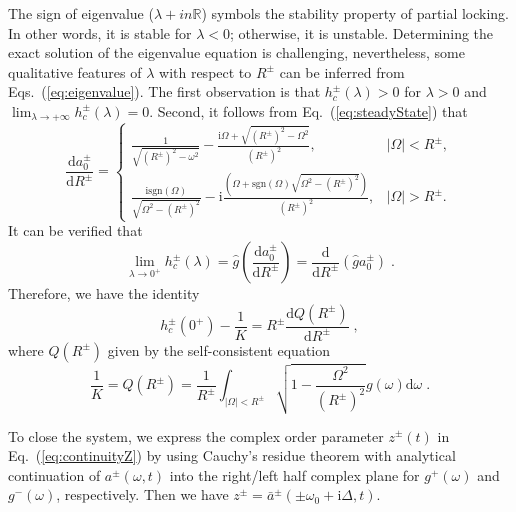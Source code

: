 \documentclass{article}
\begin{document}
The sign of eigenvalue ($\lambda+in \mathbb{R}$) symbols the stability property of partial locking. In other words, it is stable for $\lambda<0$; otherwise, it is unstable. Determining the exact solution of the eigenvalue equation is challenging, nevertheless, some qualitative features of $\lambda$ with respect to $R^{\pm}$ can be inferred from Eqs.~(\ref{eq:eigenvalue}). The first observation is that $h_c^{\pm}(\lambda) > 0$ for $\lambda > 0$ and $\lim_{\lambda \rightarrow +\infty} h_{c}^{\pm}\left( \lambda \right) =0$. Second, it follows from Eq.~(\ref{eq:steadyState}) that
{
\small
\begin{equation}
    \frac{\mathrm{d} a_{0}^{\pm}}{\mathrm{d}R^{\pm}}=\begin{cases}
        \frac{1}{\sqrt{\left( R^{\pm} \right) ^2-\omega ^2}}-\frac{\mathrm{i}\Omega +\sqrt{\left( R^{\pm} \right) ^2-\Omega ^2}}{\left( R^{\pm} \right) ^2},&		|\Omega |<R^{\pm},\\
        \frac{\mathrm{i}\text{sgn}\left(\Omega \right)}{\sqrt{\Omega ^2-\left( R^{\pm} \right) ^2}}-\mathrm{i}\frac{(\Omega +\text{sgn}\left(\Omega \right)\sqrt{\Omega ^2-\left( R^{\pm} \right) ^2})}{\left( R^{\pm} \right) ^2},&		|\Omega |>R^{\pm}.
    \end{cases}
\end{equation} 
}
It can be verified that
\begin{equation}
    \lim_{\lambda \rightarrow 0^+} h_{c}^{\pm}\left( \lambda \right)=\hat{g}\left( \frac{\mathrm{d}a_{0}^{\pm}}{\mathrm{d}R^{\pm}} \right) =\frac{\mathrm{d}}{\mathrm{d}R^{\pm}}\left( \hat{g}a_{0}^{\pm} \right) \;.
\end{equation}
Therefore, we have the identity
\begin{equation}
    h_{c}^{\pm}\left( 0^+ \right) -\frac{1}{K}=R^{\pm}\frac{\mathrm{d}Q\left( R^{\pm} \right)}{\mathrm{d}R^{\pm}}\;,
\end{equation}
where $Q\left( R^{\pm} \right)$ given by the self-consistent equation
\begin{equation}
    \frac{1}{K}=Q\left( R^{\pm} \right) =\frac{1}{R^{\pm}}\int_{\left| \Omega \right|<R^{\pm}}{\sqrt{1-\frac{\Omega ^2}{\left( R^{\pm} \right) ^2}}g\left( \omega \right) \mathrm{d}\omega}\;.
\end{equation}

To close the system, we express the complex order parameter $z^{\pm}\left( t \right)$ in Eq.~(\ref{eq:continuityZ}) by using Cauchy’s residue theorem with analytical continuation of $a^{\pm}\left( \omega ,t \right)$ into the right/left half complex plane for $g^{+}\left(\omega\right)$ and $g^{-}\left(\omega\right)$, respectively. Then we have $z^{\pm}=\bar{a}^{\pm}\left( \pm\omega _0+\mathrm{i}\Delta ,t \right) $.
\end{document}
